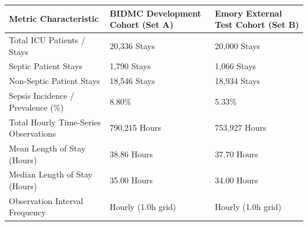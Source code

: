 \begin{tabular}{lll}
\toprule
Metric Characteristic & BIDMC Development Cohort (Set A) & Emory External Test Cohort (Set B) \\
\midrule
Total ICU Patients / Stays & 20,336 Stays & 20,000 Stays \\
Septic Patient Stays & 1,790 Stays & 1,066 Stays \\
Non-Septic Patient Stays & 18,546 Stays & 18,934 Stays \\
Sepsis Incidence / Prevalence (\%) & 8.80\% & 5.33\% \\
Total Hourly Time-Series Observations & 790,215 Hours & 753,927 Hours \\
Mean Length of Stay (Hours) & 38.86 Hours & 37.70 Hours \\
Median Length of Stay (Hours) & 35.00 Hours & 34.00 Hours \\
Observation Interval Frequency & Hourly (1.0h grid) & Hourly (1.0h grid) \\
\bottomrule
\end{tabular}
